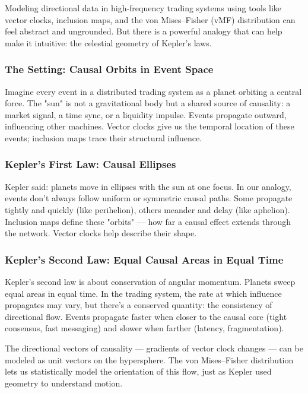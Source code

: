 Modeling directional data in high-frequency trading systems using tools like vector clocks, inclusion maps, and the von Mises--Fisher (vMF) distribution can feel abstract and ungrounded. But there is a powerful analogy that can help make it intuitive: the celestial geometry of Kepler’s laws.

\subsubsection{The Setting: Causal Orbits in Event Space}

Imagine every event in a distributed trading system as a planet orbiting a central force. The "sun" is not a gravitational body but a shared source of causality: a market signal, a time sync, or a liquidity impulse. Events propagate outward, influencing other machines. Vector clocks give us the temporal location of these events; inclusion maps trace their structural influence.

\subsubsection{Kepler’s First Law: Causal Ellipses}

Kepler said: planets move in ellipses with the sun at one focus. In our analogy, events don’t always follow uniform or symmetric causal paths. Some propagate tightly and quickly (like perihelion), others meander and delay (like aphelion). Inclusion maps define these "orbits" — how far a causal effect extends through the network. Vector clocks help describe their shape.

\subsubsection{Kepler’s Second Law: Equal Causal Areas in Equal Time}

Kepler's second law is about conservation of angular momentum. Planets sweep equal areas in equal time. In the trading system, the rate at which influence propagates may vary, but there's a conserved quantity: the consistency of directional flow. Events propagate faster when closer to the causal core (tight consensus, fast messaging) and slower when farther (latency, fragmentation). 

The directional vectors of causality — gradients of vector clock changes — can be modeled as unit vectors on the hypersphere. The von Mises--Fisher distribution lets us statistically model the orientation of this flow, just as Kepler used geometry to understand motion.

